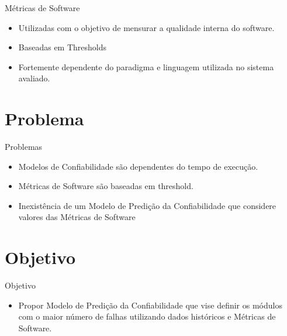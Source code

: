 \documentclass[t,14pt,mathserif]{beamer}
\begin{document}
\begin{frame}{Métricas de Software}

	\begin{itemize}
		
		\item Utilizadas com o objetivo de mensurar a qualidade interna do software.
		\item Baseadas em Thresholds
		\item Fortemente dependente do paradigma e linguagem utilizada no sistema avaliado.	
	\end{itemize}


\end{frame}
\section{Problema}
\begin{frame}{Problemas}

	\begin{itemize}
		\item Modelos de Confiabilidade são dependentes do tempo de execução.
		\item Métricas de Software são baseadas em threshold.
		\item Inexistência de um \alert{Modelo de Predição da Confiabilidade} que considere valores das \alert{Métricas de Software}
	\end{itemize}

\end{frame}
\section{Objetivo}
\begin{frame}{Objetivo}

	\begin{itemize}
		\item Propor \alert{Modelo de Predição da Confiabilidade} que vise definir os módulos com o maior número de falhas utilizando \alert{dados históricos} e \alert{Métricas de Software}.
	\end{itemize}

\end{frame}
\end{document}
